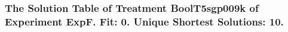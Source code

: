  \begin{frame}
 \fontsize{8pt}{9pt}\selectfont
 \frametitle{ The Solution Table of Treatment BoolT5sgp009k of Experiment ExpF. Fit: 0. Unique Shortest Solutions: 10. }

 \label{ExpFSolutionTable007.tex}  
 \end{frame}

